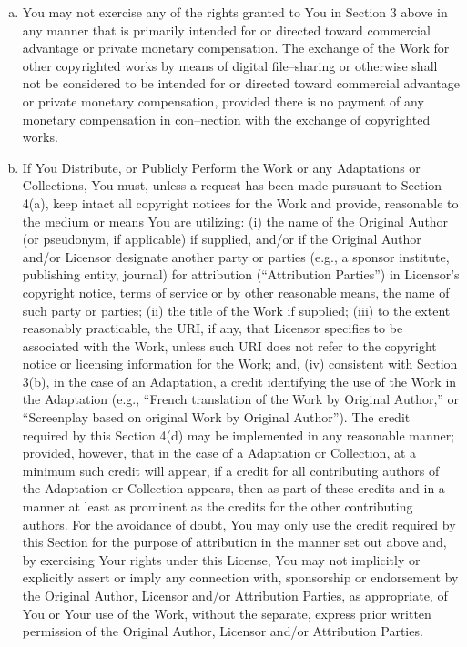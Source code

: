 \documentclass[12pt,letterpaper,oneside,final]{memoir}
\begin{document}
\begin{appendices}
\begin{enumerate}[1.]
\begin{enumerate}[a.]
   \item You may not exercise any of the rights granted to You in Section 3 above in any manner that is primarily intended for or directed toward commercial advantage or private monetary compensation. The exchange of the Work for other copyrighted works by means of digital file--sharing or otherwise shall not be considered to be intended for or directed toward commercial advantage or private monetary compensation, provided there is no payment of any monetary compensation in con--nection with the exchange of copyrighted works.
   \item If You Distribute, or Publicly Perform the Work or any Adaptations or Collections, You must, unless a request has been made pursuant to Section 4(a), keep intact all copyright notices for the Work and provide, reasonable to the medium or means You are utilizing: (i) the name of the Original Author (or pseudonym, if applicable) if supplied, and/or if the Original Author and/or Licensor designate another party or parties (e.g., a sponsor institute, publishing entity, journal) for attribution (``Attribution Parties'') in Licensor's copyright notice, terms of service or by other reasonable means, the name of such party or parties; (ii) the title of the Work if supplied; (iii) to the extent reasonably practicable, the URI, if any, that Licensor specifies to be associated with the Work, unless such URI does not refer to the copyright notice or licensing information for the Work; and, (iv) consistent with Section 3(b), in the case of an Adaptation, a credit identifying the use of the Work in the Adaptation (e.g., ``French translation of the Work by Original Author,'' or ``Screenplay based on original Work by Original Author''). The credit required by this Section 4(d) may be implemented in any reasonable manner; provided, however, that in the case of a Adaptation or Collection, at a minimum such credit will appear, if a credit for all contributing authors of the Adaptation or Collection appears, then as part of these credits and in a manner at least as prominent as the credits for the other contributing authors. For the avoidance of doubt, You may only use the credit required by this Section for the purpose of attribution in the manner set out above and, by exercising Your rights under this License, You may not implicitly or explicitly assert or imply any connection with, sponsorship or endorsement by the Original Author, Licensor and/or Attribution Parties, as appropriate, of You or Your use of the Work, without the separate, express prior written permission of the Original Author, Licensor and/or Attribution Parties.

\end{enumerate}
\end{enumerate}
\end{appendices}
\end{document}
